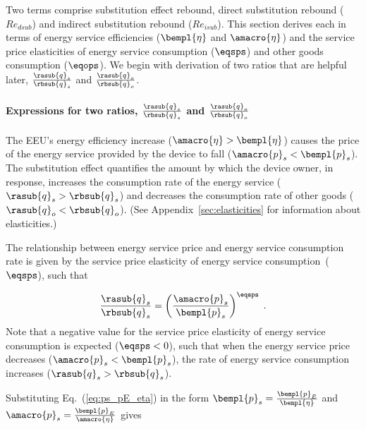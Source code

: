 \subsubsection{\Subeffect{}} 
\label{sec:Re_sub}

Two terms comprise substitution effect rebound,
direct substitution rebound ($Re_{dsub}$) and
indirect substitution rebound ($Re_{isub}$).
This section derives each in terms of 
energy service efficiencies ($\bempl{\eta}$ and $\amacro{\eta}$) and
the service price elasticities 
of energy service consumption ($\eqsps$) and
other goods consumption ($\eqops$).
We begin with derivation of two ratios that are helpful later,
$\frac{\rasub{q}_s}{\rbsub{q}_s}$ and
$\frac{\rasub{q}_o}{\rbsub{q}_o}$.


\paragraph{Expressions for two ratios, $\frac{\rasub{q}_s}{\rbsub{q}_s}$ and $\frac{\rasub{q}_o}{\rbsub{q}_o}$}
\label{sec:two_ratios}

The EEU's energy efficiency increase
($\amacro{\eta} > \bempl{\eta}$)
causes the price of the energy service provided by the device to fall
($\amacro{p}_s < \bempl{p}_s$).
The substitution effect quantifies the amount by which
the device owner, in response,
increases the consumption rate of the energy service ($\rasub{q}_s > \rbsub{q}_s$) and
decreases the consumption rate of other goods ($\rasub{q}_o < \rbsub{q}_o$).
(See Appendix~\ref{sec:elasticities} for information about elasticities.)

The relationship between energy service price and energy service consumption rate
is given by the service price elasticity of energy service consumption~($\eqsps$),
such that

\begin{equation}
  \frac{\rasub{q}_s}{\rbsub{q}_s} = \left( \frac{\amacro{p}_s}{\bempl{p}_s} \right)^{\eqsps} \; .
\end{equation}
%
Note that a negative value for the service price elasticity of energy service consumption
is expected ($\eqsps < 0$),
such that when the energy service price decreases ($\amacro{p}_s < \bempl{p}_s$),
the rate of energy service consumption increases ($\rasub{q}_s > \rbsub{q}_s$).

Substituting Eq.~(\ref{eq:ps_pE_eta}) in the form
$\bempl{p}_s = \frac{\bempl{p}_E}{\bempl{\eta}}$ and
$\amacro{p}_s = \frac{\bempl{p}_E}{\amacro{\eta}}$
gives

